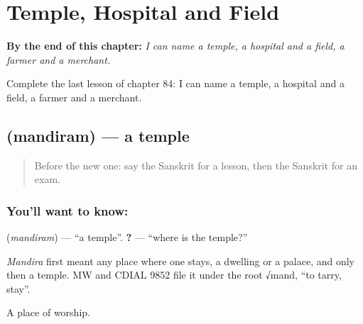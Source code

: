 
\chapter{Temple, Hospital and Field}
\label{ch:sa-temple-hospital-field}

\begin{chapteropening}
\textbf{By the end of this chapter:} \emph{I can name a temple, a hospital and a field, a farmer and a merchant.}

Complete the last lesson of chapter 84: I can name a temple, a hospital and a field, a farmer and a merchant.
\end{chapteropening}

\section[\texorpdfstring{\sk{मन्दिरम्} (mandiram)}{मन्दिरम् (mandiram)}]{ (mandiram) — a temple}

\label{lesson:SA-C84-temple}



\begin{quote}
Before the new one: say the Sanskrit for a lesson, then the Sanskrit for an exam.
\end{quote}

\subsection*{You'll want to know: }
\textbf{} (\emph{mandiram}) — \textquotedblleft{}a temple\textquotedblright{}. \textbf{ ?} — \textquotedblleft{}where is the temple?\textquotedblright{}

\begin{cousinweb}
\emph{Mandira} first meant any place where one stays, a dwelling or a palace, and only then a temple. MW and CDIAL 9852 file it under the root √mand, \textquotedblleft{}to tarry, stay\textquotedblright{}.
\end{cousinweb}

\begin{grammarlens}[title={What you've built}]
A place of worship.
\end{grammarlens}

